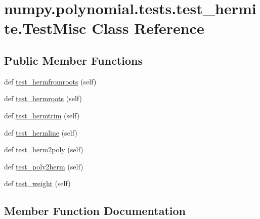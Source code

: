 \hypertarget{classnumpy_1_1polynomial_1_1tests_1_1test__hermite_1_1TestMisc}{}\section{numpy.\+polynomial.\+tests.\+test\+\_\+hermite.\+Test\+Misc Class Reference}
\label{classnumpy_1_1polynomial_1_1tests_1_1test__hermite_1_1TestMisc}
\subsection*{Public Member Functions}
\begin{DoxyCompactItemize}
\item 
def \hyperlink{classnumpy_1_1polynomial_1_1tests_1_1test__hermite_1_1TestMisc_a4a98d8b96f2bc0a98475a51d72e54140}{test\+\_\+hermfromroots} (self)
\item 
def \hyperlink{classnumpy_1_1polynomial_1_1tests_1_1test__hermite_1_1TestMisc_a02d547d749ed19e470faaf9b3a6957b2}{test\+\_\+hermroots} (self)
\item 
def \hyperlink{classnumpy_1_1polynomial_1_1tests_1_1test__hermite_1_1TestMisc_a5d9ca4e87afb20f203e5b17208061a13}{test\+\_\+hermtrim} (self)
\item 
def \hyperlink{classnumpy_1_1polynomial_1_1tests_1_1test__hermite_1_1TestMisc_aad7eb6f50671199da86e47334371cd0c}{test\+\_\+hermline} (self)
\item 
def \hyperlink{classnumpy_1_1polynomial_1_1tests_1_1test__hermite_1_1TestMisc_ab3a1d262d09e6a111651c6416fc25a26}{test\+\_\+herm2poly} (self)
\item 
def \hyperlink{classnumpy_1_1polynomial_1_1tests_1_1test__hermite_1_1TestMisc_af46e7eb9777c7978d617174dd3126a30}{test\+\_\+poly2herm} (self)
\item 
def \hyperlink{classnumpy_1_1polynomial_1_1tests_1_1test__hermite_1_1TestMisc_a1e349efb626a988fd7afed80ab034f44}{test\+\_\+weight} (self)
\end{DoxyCompactItemize}


\subsection{Member Function Documentation}
\mbox{\label{classnumpy_1_1polynomial_1_1tests_1_1test__hermite_1_1TestMisc_ab3a1d262d09e6a111651c6416fc25a26}} 
